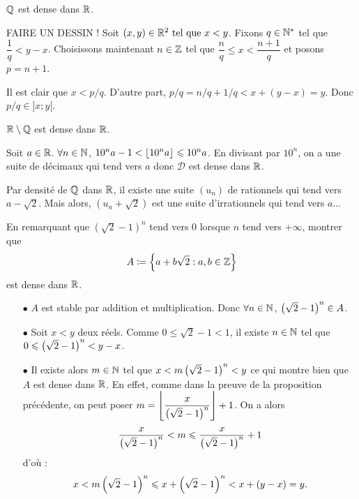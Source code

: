 \documentclass{magnolia}
\begin{document}
  \begin{proposition}[utile=-3]
  $\mathbb{Q}$ est dense dans $\mathbb{R}$.
  \end{proposition}
  
  \begin{preuve}
  FAIRE UN DESSIN ! Soit $(x,y)\in \mathbb{R}^2 \text{ tel que } x<y$. Fixons $q\in {\mathbb{N}^*}$ tel que $\dfrac{1}{q}<y-x$. Choisissons maintenant $n\in\mathbb{Z}$ tel que $\dfrac{n}{q}\leq x < \dfrac{n+1}{q}$ et posons $p=n+1$.
  
  Il est clair que $x<p/q$. D'autre part, $p/q=n/q+1/q <x+(y-x)=y$. Donc $p/q\in ]x;y[$.
  \end{preuve}
  
  \begin{remarqueUnique}
  \remarque $\mathbb{R}\setminus\mathbb{Q}$ est dense dans $\mathbb{R}$.
  \begin{sol}
  Soit $a\in \mathbb{R}$. $\forall n \in \mathbb{N}$, $10^n a-1 < \left\lfloor10^n a\right\rfloor\leqslant 10^n a$. En divisant par $10^n$, on a une suite de décimaux qui tend vers $a$ donc $\mathcal{D}$ est dense dans $\mathbb{R}$.
  
  Par densité de $\mathbb{Q}$ dans $\mathbb{R}$, il existe une suite $(u_n)$ de rationnels qui tend vers $a-\sqrt{2}$. Mais alors, $(u_n+\sqrt{2})$ est une suite d'irrationnels qui tend vers $a$...
  \end{sol}
  \end{remarqueUnique}
  
  \begin{exoUnique}
  \exo En remarquant que $(\sqrt{2}-1)^n$ tend vers 0 lorsque $n$ tend vers
    $+\infty$, montrer que
    \[A\coloneqq\left\{a+b\sqrt{2} : a,b\in\mathbb{Z}\right\}\]
    est dense dans $\mathbb{R}$.
    
  \begin{sol}
  \begin{itemize}
  \item[$\bullet$] $A$ est stable par addition et multiplication. Donc $\forall n \in \mathbb{N}$, $\left(\sqrt{2}-1\right)^n \in A$.
  \item[$\bullet$] Soit $x<y$ deux réels. Comme $0\leq \sqrt{2}-1<1$, il existe $n\in \mathbb{N}$ tel que $0\leqslant \left(\sqrt{2}-1\right)^n < y-x$.
  \item[$\bullet$] Il existe alors $m\in \mathbb{N}$ tel que $x<m\left(\sqrt{2}-1\right)^n <y$ ce qui montre bien que $A$ est dense dans $\mathbb{R}$. En effet, comme dans la preuve de la proposition précédente, on peut poser $m=\displaystyle \left\lfloor\frac{x}{\left(\sqrt{2}-1\right)^n}\right\rfloor+1$. On a alors $$\frac{x}{\left(\sqrt{2}-1\right)^n}<m \leqslant \frac{x}{\left(\sqrt{2}-1\right)^n}+1$$ d'où :$$x<m\left(\sqrt{2}-1\right)^n \leqslant x+\left(\sqrt{2}-1\right)^n <x+(y-x)=y.$$
  
  \end{itemize}
  \end{sol}
  \end{exoUnique}
\end{document}
